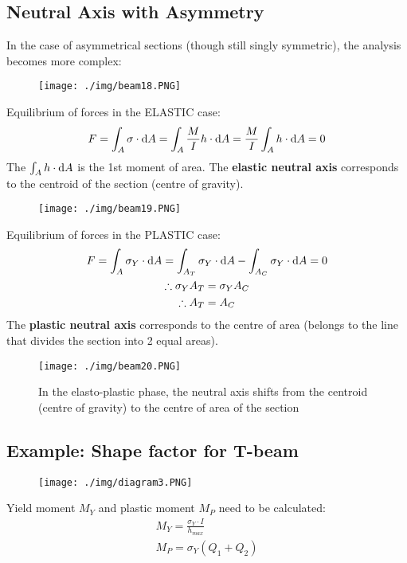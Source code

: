 \subsection{Neutral Axis with Asymmetry}
In the case of asymmetrical sections (though still singly symmetric), the analysis becomes more complex:
\begin{figure}[H]
  \centering
  \texttt{[image: ./img/beam18.PNG]}
\end{figure}
Equilibrium of forces in the ELASTIC case:
\begin{gather}
  F = \int_{A}\sigma\cdot\dif A = \int_{A}\frac{M}{I}h\cdot\dif A = \frac{M}{I}\int_{A}h\cdot\dif A = 0
\end{gather}
The $\int_{A}h\cdot\dif A$ is the 1st moment of area. The \textbf{elastic neutral axis} corresponds to the centroid of the section (centre of gravity).
\begin{figure}[H]
  \centering
  \texttt{[image: ./img/beam19.PNG]}
\end{figure}
Equilibrium of forces in the PLASTIC case:
\begin{gather}
  F = \int_{A}\sigma_Y\cdot\dif A = \int_{A_T}\sigma_Y\cdot\dif A - \int_{A_C}\sigma_Y\cdot\dif A = 0 \\
  \therefore \sigma_Y A_T = \sigma_Y A_C \\
  \therefore A_T = A_C
\end{gather}
The \textbf{plastic neutral axis} corresponds to the centre of area (belongs to the line that divides the section into 2 equal areas).
\begin{figure}[H]
  \centering
  \texttt{[image: ./img/beam20.PNG]}
  \caption{In the elasto-plastic phase, the neutral axis shifts from the centroid (centre of gravity) to the centre of area of the section}
\end{figure}
\subsection{Example: Shape factor for T-beam}
\begin{figure}[H]
  \centering
  \texttt{[image: ./img/diagram3.PNG]}
\end{figure}
Yield moment $M_Y$ and plastic moment $M_P$ need to be calculated:
\begin{gather}
  M_Y = \frac{\sigma_Y\cdot I}{h_{max}} \\
  M_P = \sigma_Y(Q_1+Q_2)
\end{gather}
